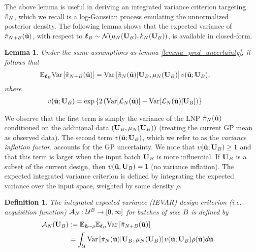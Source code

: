 \documentclass[12pt]{article}
\newtheorem{definition}{Definition}
\newtheorem{lemma}{Lemma}
\begin{document}
The above lemma is useful in deriving an integrated variance criterion targeting $\tilde{\postDens}_{\Ndesign}$, which we recall is a log-Gaussian process emulating the unnormalized 
posterior density. The following lemma shows that the expected variance of $\tilde{\postDens}_{\Ndesign+\Nbatch}(\newInput)$, with respect to 
$\outputVecBatch \sim \Gaussian(\GPMeanPred[\Ndesign](\inputMatBatch), \GPKerPred[\Ndesign](\inputMatBatch))$, is available in closed-form. 
\begin{lemma}
Under the same assumptions as lemma \ref{lemma_pred_uncertainty}, it follows that 
\begin{align*}
\E_{\outputVecBatch} \Var\left[\tilde{\postDens}_{\Ndesign+\Nbatch}(\newInput) \right]
&= \Var\left[\tilde{\postDens}_{\Ndesign}(\newInput)| \inputMatBatch, \GPMeanPred[\Ndesign](\inputMatBatch) \right] v(\newInput; \inputMatBatch),
\end{align*}
where 
\begin{align*}
v(\newInput; \inputMatBatch) &= \exp\left\{2\left(\Var[\llik_{\Ndesign}(\newInput)] - \Var[\llik_{\Ndesign}(\newInput)| \inputMatBatch] \right) \right\}
\end{align*}
\end{lemma}
We observe that the first term is simply the variance of the LNP $\tilde{\postDens}_{\Ndesign}(\newInput)$ conditioned on the additional data 
$(\inputMatBatch, \GPMeanPred[\Ndesign](\inputMatBatch))$ (treating the current GP mean as observed data). The second term 
$v(\newInput; \inputMatBatch)$, which we refer to as the \textit{variance inflation factor}, accounts for the GP uncertainty. We note that 
$v(\newInput; \inputMatBatch) \geq 1$ and that this term is larger when the input batch $\inputMatBatch$ is more influential. If 
$\inputMatBatch$ is a subset of the current design, then $v(\newInput; \inputMatBatch) = 1$ (no variance inflation). The expected integrated 
variance criterion is defined by integrating the expected variance over the input space, weighted by some density $\rho$. 
\begin{definition} 
The integrated expected variance (IEVAR) design criterion (i.e. acquisition function) $\acq[\Ndesign]: \parSpace^{\Nbatch} \to [0, \infty]$
for batches of size $\Nbatch$ is defined by 
\begin{align*}
\acq[\Ndesign](\inputMatBatch)
&:= \E_{\newInput \sim \rho} \E_{\outputVecBatch} \Var\left[\tilde{\postDens}_{\Ndesign+\Nbatch}(\newInput) \right] \\
&= \int_{\parSpace} \Var\left[\tilde{\postDens}_{\Ndesign}(\newInput)| \inputMatBatch, \GPMeanPred[\Ndesign](\inputMatBatch) \right]
v(\newInput; \inputMatBatch) \rho(\newInput) d\newInput.
\end{align*}
\end{definition} 
\end{document}
